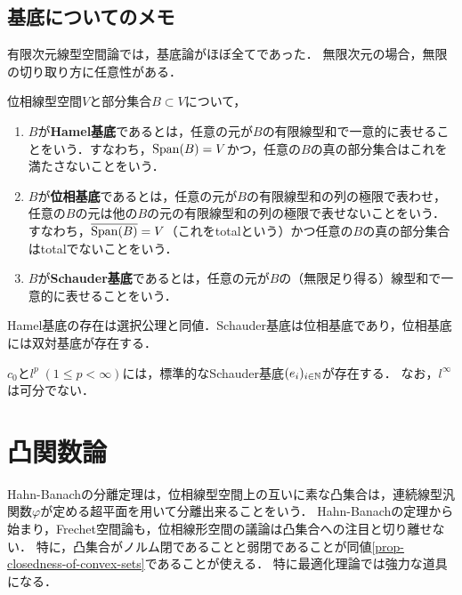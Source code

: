 \documentclass[uplatex,dvipdfmx]{jsreport}
\begin{document}
\subsection{基底についてのメモ}

\begin{tcolorbox}[colframe=ForestGreen, colback=ForestGreen!10!white,breakable,colbacktitle=ForestGreen!40!white,coltitle=black,fonttitle=\bfseries\sffamily,
title=]
    有限次元線型空間論では，基底論がほぼ全てであった．
    無限次元の場合，無限の切り取り方に任意性がある．
\end{tcolorbox}

\begin{definition}
    位相線型空間$V$と部分集合$B\subset V$について，
    \begin{enumerate}
        \item $B$が\textbf{Hamel基底}であるとは，任意の元が$B$の有限線型和で一意的に表せることをいう．すなわち，$\mathrm{Span}(B)=V$かつ，任意の$B$の真の部分集合はこれを満たさないことをいう．
        \item $B$が\textbf{位相基底}であるとは，任意の元が$B$の有限線型和の列の極限で表わせ，任意の$B$の元は他の$B$の元の有限線型和の列の極限で表せないことをいう．すなわち，$\overline{\mathrm{Span}(B)}=V$（これをtotalという）かつ任意の$B$の真の部分集合はtotalでないことをいう．
        \item $B$が\textbf{Schauder基底}であるとは，任意の元が$B$の（無限足り得る）線型和で一意的に表せることをいう．
    \end{enumerate}
\end{definition}
\begin{remarks}
    Hamel基底の存在は選択公理と同値．Schauder基底は位相基底であり，位相基底には双対基底が存在する．
\end{remarks}

\begin{example}
    $c_0$と$l^p\;(1\le p<\infty)$には，標準的なSchauder基底$(e_i)_{i\in\mathbb{N}}$が存在する．
    なお，$l^\infty$は可分でない．
\end{example}

\section{凸関数論}

\begin{tcolorbox}[colframe=ForestGreen, colback=ForestGreen!10!white,breakable,colbacktitle=ForestGreen!40!white,coltitle=black,fonttitle=\bfseries\sffamily,
title=凸解析の整備]
    Hahn-Banachの分離定理は，位相線型空間上の互いに素な凸集合は，連続線型汎関数$\varphi$が定める超平面を用いて分離出来ることをいう．
    Hahn-Banachの定理から始まり，Frechet空間論も，位相線形空間の議論は凸集合への注目と切り離せない．
    特に，凸集合がノルム閉であることと弱閉であることが同値\ref{prop-closedness-of-convex-sets}であることが使える．
    特に最適化理論では強力な道具になる．
\end{tcolorbox}
\end{document}
